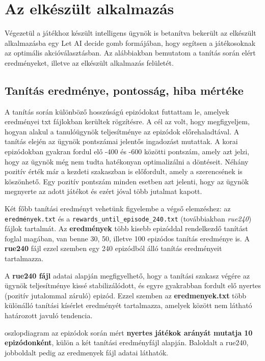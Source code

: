 \documentclass[
]{thesis-ekf}
\theoremstyle{definition}
\theoremstyle{remark}
\begin{document}
	\chapter{Az elkészült alkalmazás}
	
	Végezetül a játékhoz készült intelligens ügynök is betanítva bekerült az elkészült alkalmazásba egy Let AI decide gomb formájában, hogy segítsen a játékosoknak az optimális akcióválasztásban. Az alábbiakban bemutatom a tanítás során elért eredményeket, illetve az elkészült alkalmazás felületét.
	
	\section{Tanítás eredménye, pontosság, hiba mértéke}
	
	A tanítás során különböző hosszúságú epizódokat futtattam le, amelyek eredményei txt fájlokban kerültek rögzítésre. A cél az volt, hogy megfigyeljem, hogyan alakul a tanulóügynök teljesítménye az epizódok előrehaladtával. A tanítás elején az ügynök pontszámai jelentős ingadozást mutattak. A korai epizódokban gyakran fordul elő -400 és -600 közötti pontszám, amely azt jelzi, hogy az ügynök még nem tudta hatékonyan optimalizálni a döntéseit. Néhány pozitív érték már a kezdeti szakaszban is előfordult, amely a szerencsének is köszönhető. Egy pozitív pontszám minden esetben azt jelenti, hogy az ügynök megnyerte az adott játékot és ezért jóval több jutalmat kapott. 
	
	Két főbb tanítási eredményt vehetünk figyelembe a végső elemzéshez: az \texttt{eredmények.txt} és a \texttt{rewards\_until\_episode\_240.txt} (továbbiakban \emph{rue240}) fájlok tartalmát. Az \textbf{eredmények} több kisebb epizóddal rendelkezdő tanítást foglal magában, van benne 30, 50, illetve 100 epizódos tanítás eredménye is. A \textbf{rue240} fájl ezzel szemben egy 240 epizódból álló tanítás eredményeit tartalmazza. 
	
	A \textbf{rue240 fájl} adatai alapján megfigyelhető, hogy a tanítási szakasz végére az ügynök teljesítménye kissé stabilizálódott, és egyre gyakrabban fordult elő nyertes (pozitív jutalommal záruló) epizód. Ezzel szemben az \textbf{eredmenyek.txt} több különálló tanítási kísérlet eredményét tartalmazza, amelyek között nem látható határozott javuló tendencia.
	
	 oszlopdiagram az epizódok során mért \textbf{nyertes játékok arányát mutatja 10 epizódonként}, külön a két tanítási eredményfájl alapján. Baloldalt a rue240, jobboldalt pedig az eredmenyek fájl adatai láthatók.
	
\end{document}
